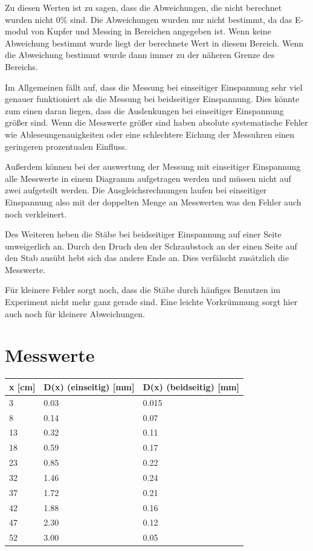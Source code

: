 \noindent Zu diesen Werten ist zu sagen, dass die Abweichungen, die nicht berechnet wurden nicht 0\% sind. Die Abweichungen wurden nur nicht bestimmt, da das E-modul von Kupfer und Messing in Bereichen angegeben ist. Wenn keine Abweichung bestimmt wurde liegt der berechnete Wert in diesem Bereich. Wenn die Abweichung bestimmt wurde dann immer zu der näheren Grenze des Bereichs. 

\noindent Im Allgemeinen fällt auf, dass die Messung bei einseitiger Einspannung sehr viel genauer funktioniert als die Messung bei beidseitiger Einspannung. Dies könnte zum einen daran liegen, dass die Auslenkungen bei einseitiger Einspannung größer sind. Wenn die Messwerte größer sind haben absolute systematische Fehler wie Ableseungenauigkeiten oder eine schlechtere Eichung der Messuhren einen geringeren prozentualen Einfluss. 

\noindent Außerdem können bei der auswertung der Messung mit einseitiger Einspannung alle Messwerte in einem Diagramm aufgetragen werden und müssen nicht auf zwei aufgeteilt werden. Die Ausgleichsrechnungen laufen bei einseitiger Einspannung also mit der doppelten Menge an Messwerten was den Fehler auch noch verkleinert. 

\noindent Des Weiteren heben die Stäbe bei beidseitiger Einspannung auf einer Seite unweigerlich an. Durch den Druch den der Schraubstock an der einen Seite auf den Stab ausübt hebt sich das andere Ende an. Dies verfälscht zusätzlich die Messwerte.

\noindent Für kleinere Fehler sorgt noch, dass die Stäbe durch häufiges Benutzen im Experiment nicht mehr ganz gerade sind. Eine leichte Vorkrümmung sorgt hier auch noch für kleinere Abweichungen.

\section{Messwerte}

\begin{minipage}{\linewidth}
    \begin{table}[H]
        \centering
    \begin{tabular}{lll}
        \toprule
        x [cm] & D(x) (einseitig) [mm] & D(x) (beidseitig) [mm] \\
        \midrule
        3  & 0.03 & 0.015 \\
        8  & 0.14 & 0.07  \\
        13 & 0.32 & 0.11  \\
        18 & 0.59 & 0.17  \\
        23 & 0.85 & 0.22  \\
        32 & 1.46 & 0.24  \\
        37 & 1.72 & 0.21  \\
        42 & 1.88 & 0.16  \\
        47 & 2.30 & 0.12  \\
        52 & 3.00 & 0.05  \\
        \bottomrule   
    \end{tabular}
    
    \label{tab:1}
\end{table}
\end{minipage}


